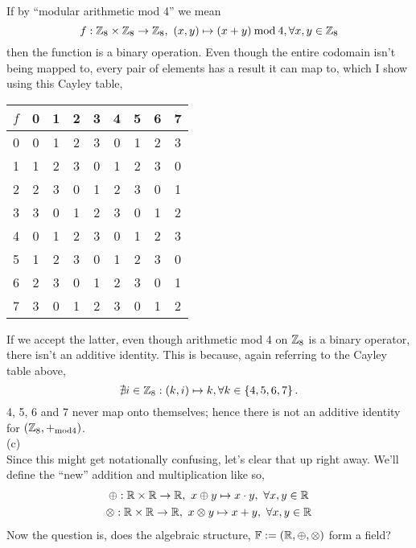 \documentclass[a4paper,12pt]{report}
\begin{document}
If by ``modular arithmetic mod 4'' we mean
$$
	f:\mathbb{Z}_8\times\mathbb{Z}_8\to\mathbb{Z}_8,\ (x,y)\mapsto (x+y)\mathbin{\mathrm{mod}}{4}, \forall x,y\in\mathbb{Z}_8
$$
then the function is a binary operation. Even though the entire codomain isn't being mapped to, every pair of elements has a result it can map to, which I show using this Cayley table,
\begin{center}
	\begin{tabular}{c|cccccccc}
		$f$ & 0 & 1 & 2 & 3 & 4 & 5 & 6 & 7 \\ \hline
		0		&	0	&	1	&	2	&	3	&	0	&	1	&	2	&	3 \\
		1		&	1	&	2	&	3	&	0	&	1	&	2	&	3	&	0 \\
		2		&	2	&	3	&	0	&	1	&	2	&	3	&	0	&	1 \\
		3		&	3	&	0	&	1	&	2	&	3	&	0	&	1	&	2 \\
		4		&	0	&	1	&	2	&	3	&	0	&	1	&	2	&	3 \\
		5		&	1	&	2 &	3	&	0	&	1	&	2 &	3	&	0 \\
		6		&	2	&	3	&	0	&	1	&	2	&	3	&	0	&	1 \\
		7		&	3	&	0	&	1	&	2	&	3	&	0	&	1	&	2 \\
	\end{tabular}
\end{center}

If we accept the latter, even though arithmetic mod 4 on $\mathbb{Z}_8$ is a binary operator, there isn't an additive identity. This is because, again referring to the Cayley table above, 
$$
	\nexists i\in\mathbb{Z}_8: (k,i)\mapsto k, \forall k\in\left\lbrace 4,5,6,7 \right\rbrace.
$$
4, 5, 6 and 7 never map onto themselves; hence there is not an additive identity for $(\mathbb{Z}_8, +_{\mathbin{\mathrm{mod}}{4}})$. \\

\sol (c) \\
Since this might get notationally confusing, let's clear that up right away. We'll define the ``new'' addition and multiplication like so,
\begin{gather*}
	\oplus:\mathbb{R}\times\mathbb{R}\to\mathbb{R},\ x\oplus y \mapsto x \cdot y,\ \forall x,y\in\mathbb{R} \\
	\otimes:\mathbb{R}\times\mathbb{R}\to\mathbb{R},\ x\otimes y \mapsto x + y,\ \forall x,y\in\mathbb{R}
\end{gather*}
Now the question is, does the algebraic structure, $\mathbb{F} := (\mathbb{R},\oplus,\otimes)$ form a field? \\
\end{document}

